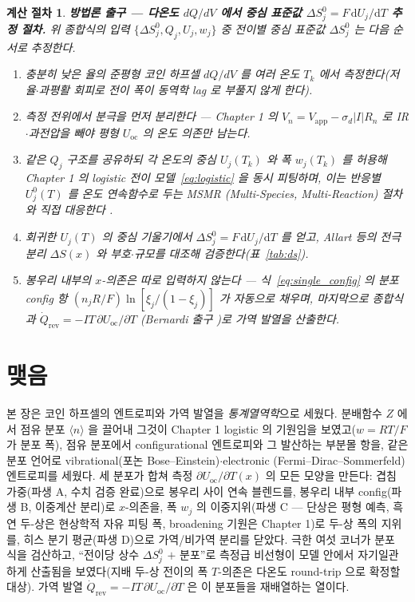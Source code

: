 \documentclass[11pt,a4paper]{article}
\newtheorem*{procedurebox}{계산 절차}
\newcommand{\dd}{\mathrm{d}}
\newcommand{\rev}{\mathrm{rev}}
\newcommand{\oc}{\mathrm{oc}}
\newcommand{\avg}[1]{\langle #1\rangle}
\begin{document}
\begin{procedurebox}
\textbf{방법론 출구 — 다온도 $dQ/dV$ 에서 중심 표준값 $\Delta S^0_j=F\,\dd U_j/\dd T$ 추정 절차.} 위 종합식의 입력
$\{\Delta S^0_j,Q_j,U_j,w_j\}$ 중 전이별 중심 표준값 $\Delta S^0_j$ 는 다음 순서로 추정한다.
\begin{enumerate}[leftmargin=1.8em,itemsep=2pt,topsep=2pt]
\item 충분히 낮은 율의 준평형 코인 하프셀 $dQ/dV$ 를 여러 온도 $T_k$ 에서 측정한다(저율$\cdot$과평활 회피로
전이 폭이 동역학 lag 로 부풀지 않게 한다).
\item 측정 전위에서 분극을 먼저 분리한다 — Chapter 1 의 $V_n=V_\mathrm{app}-\sigma_d|I|R_n$ 로 IR$\cdot$과전압을
빼야 \emph{평형} $U_\oc$ 의 온도 의존만 남는다.
\item 같은 $Q_j$ 구조를 공유하되 각 온도의 중심 $U_j(T_k)$ 와 폭 $w_j(T_k)$ 를 허용해 Chapter 1 의 logistic
전이 모델~\eqref{eq:logistic} 을 \emph{동시} 피팅하며, 이는 반응별 $U_j^0(T)$ 를 온도 연속함수로 두는 MSMR
(Multi-Species, Multi-Reaction) 절차와 직접 대응한다 \cite{msmr_partI,msmr_partII}.
\item 회귀한 $U_j(T)$ 의 중심 기울기에서 $\Delta S^0_j=F\,\dd U_j/\dd T$ 를 얻고, Allart 등의 전극 분리
$\Delta S(x)$ \cite{allart2018} 와 부호$\cdot$규모를 대조해 검증한다(표~\ref{tab:ds}).
\item 봉우리 \emph{내부}의 $x$-의존은 따로 입력하지 않는다 — 식~\eqref{eq:single_config} 의 분포 config 항
$(n_jR/F)\ln[\xi_j/(1-\xi_j)]$ 가 자동으로 채우며, 마지막으로 종합식과 $\dot Q_\rev=-IT\,\partial U_\oc/\partial T$
(Bernardi 출구 \cite{bernardi1985})로 가역 발열을 산출한다.
\end{enumerate}
\end{procedurebox}

\section*{맺음}
본 장은 코인 하프셀의 엔트로피와 가역 발열을 \emph{통계열역학}으로 세웠다. 분배함수 $Z$ 에서 점유 분포
$\avg{n}$ 을 끌어내 그것이 Chapter 1 logistic 의 기원임을 보였고($w=RT/F$ 가 분포 폭), 점유 분포에서
configurational 엔트로피와 그 발산하는 부분몰 항을, 같은 분포 언어로 vibrational(포논 Bose--Einstein)$\cdot$electronic
(Fermi--Dirac--Sommerfeld) 엔트로피를 세웠다. 세 분포가 합쳐 측정 $\partial U_\oc/\partial T(x)$ 의 모든 모양을 만든다:
겹침 가중(파생 A, 수치 검증 완료)으로 봉우리 사이 연속 블렌드를, 봉우리 내부 config(파생 B, 이중계산 분리)로
$x$-의존을, 폭 $w_j$ 의 이중지위(파생 C — 단상은 평형 예측, 흑연 두-상은 현상학적 자유 피팅 폭, broadening
기원은 Chapter 1)로 두-상 폭의 지위를, 히스 분기 평균(파생 D)으로 가역/비가역
분리를 닫았다. 극한 여섯 코너가 분포 식을 검산하고, ``전이당 상수 $\Delta S^0_j$ $+$ 분포''로 측정급 비선형이
모델 안에서 자기일관하게 산출됨을 보였다(지배 두-상 전이의 폭 $T$-의존은 다온도 round-trip 으로 확정할 대상).
가역 발열 $\dot Q_\rev=-IT\,\partial U_\oc/\partial T$ 은 이 분포들을 재배열하는 열이다.
\end{document}
